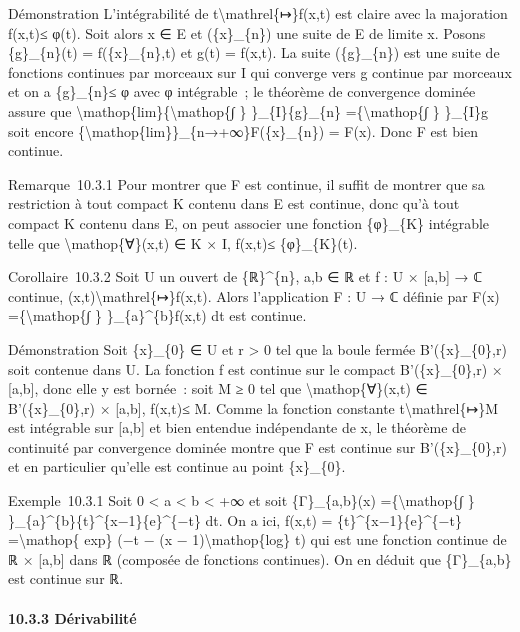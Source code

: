 \documentclass[]{article}
\begin{document}
Démonstration L'intégrabilité de t\textbackslash{}mathrel\{↦\}f(x,t) est
claire avec la majoration \textbar{}f(x,t)\textbar{}≤ φ(t). Soit alors x
∈ E et (\{x\}\_\{n\}) une suite de E de limite x. Posons \{g\}\_\{n\}(t)
= f(\{x\}\_\{n\},t) et g(t) = f(x,t). La suite (\{g\}\_\{n\}) est une
suite de fonctions continues par morceaux sur I qui converge vers g
continue par morceaux et on a \textbar{}\{g\}\_\{n\}\textbar{}≤ φ avec φ
intégrable~; le théorème de convergence dominée assure que
\textbackslash{}mathop\{lim\}\{\textbackslash{}mathop\{∫ \}
\}\_\{I\}\{g\}\_\{n\} =\{\textbackslash{}mathop\{∫ \} \}\_\{I\}g soit
encore \{\textbackslash{}mathop\{lim\}\}\_\{n→+∞\}F(\{x\}\_\{n\}) =
F(x). Donc F est bien continue.

Remarque~10.3.1 Pour montrer que F est continue, il suffit de montrer
que sa restriction à tout compact K contenu dans E est continue, donc
qu'à tout compact K contenu dans E, on peut associer une fonction
\{φ\}\_\{K\} intégrable telle que \textbackslash{}mathop\{∀\}(x,t) ∈ K ×
I, \textbar{}f(x,t)\textbar{}≤ \{φ\}\_\{K\}(t).

Corollaire~10.3.2 Soit U un ouvert de \{ℝ\}\^{}\{n\}, a,b ∈ ℝ et f : U ×
{[}a,b{]} → ℂ continue, (x,t)\textbackslash{}mathrel\{↦\}f(x,t). Alors
l'application F : U → ℂ définie par F(x) =\{\textbackslash{}mathop\{∫ \}
\}\_\{a\}\^{}\{b\}f(x,t) dt est continue.

Démonstration Soit \{x\}\_\{0\} ∈ U et r \textgreater{} 0 tel que la
boule fermée B'(\{x\}\_\{0\},r) soit contenue dans U. La fonction f est
continue sur le compact B'(\{x\}\_\{0\},r) × {[}a,b{]}, donc elle y est
bornée~: soit M ≥ 0 tel que \textbackslash{}mathop\{∀\}(x,t) ∈
B'(\{x\}\_\{0\},r) × {[}a,b{]}, \textbar{}f(x,t)\textbar{}≤ M. Comme la
fonction constante t\textbackslash{}mathrel\{↦\}M est intégrable sur
{[}a,b{]} et bien entendue indépendante de x, le théorème de continuité
par convergence dominée montre que F est continue sur B'(\{x\}\_\{0\},r)
et en particulier qu'elle est continue au point \{x\}\_\{0\}.

Exemple~10.3.1 Soit 0 \textless{} a \textless{} b \textless{} +∞ et soit
\{Γ\}\_\{a,b\}(x) =\{\textbackslash{}mathop\{∫ \}
\}\_\{a\}\^{}\{b\}\{t\}\^{}\{x−1\}\{e\}\^{}\{−t\} dt. On a ici, f(x,t) =
\{t\}\^{}\{x−1\}\{e\}\^{}\{−t\} =\textbackslash{}mathop\{ exp\} (−t − (x
− 1)\textbackslash{}mathop\{log\} t) qui est une fonction continue de ℝ
× {[}a,b{]} dans ℝ (composée de fonctions continues). On en déduit que
\{Γ\}\_\{a,b\} est continue sur ℝ.

\paragraph{10.3.3 Dérivabilité}
\end{document}
